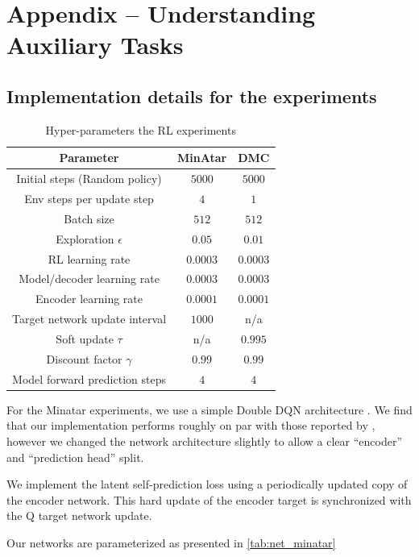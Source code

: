 \chapter{Appendix -- Understanding Auxiliary Tasks}


\section{Implementation details for the experiments}
\label{app:understanding:empirical}

\begin{table}[t]
    \centering
    \caption{Hyper-parameters the RL experiments}
    \label{tab:hyper_minatar}
    \begin{tabular}{c|c|c}
        Parameter & MinAtar & DMC \\\hline 
        Initial steps (Random policy) & $5000$ & $5000$  \\
        Env steps per update step & $4$ & $1$\\
        Batch size & $512$ & $512$\\
        Exploration $\epsilon$ & $0.05$ & $0.01$\\
        RL learning rate & $0.0003$ & $0.0003$\\
        Model/decoder learning rate & $0.0003$ & $0.0003$\\
        Encoder learning rate & $0.0001$ & $0.0001$\\
        Target network update interval & $1000$ & n/a\\
        Soft update $\tau$ & n/a & $0.995$ \\
        Discount factor $\gamma$ & $0.99$ & $0.99$\\
        Model forward prediction steps & $4$ & $4$\\
    \end{tabular}
\end{table}

For the Minatar experiments, we use a simple Double DQN architecture \parencite{van2016deep}.
We find that our implementation performs roughly on par with those reported by \textcite{young19minatar}, however we changed the network architecture slightly to allow a clear ``encoder'' and ``prediction head'' split.

We implement the latent self-prediction loss using a periodically updated copy of the encoder network. This hard update of the encoder target is synchronized with the Q target network update.

Our networks are parameterized as presented in \autoref{tab:net_minatar}

